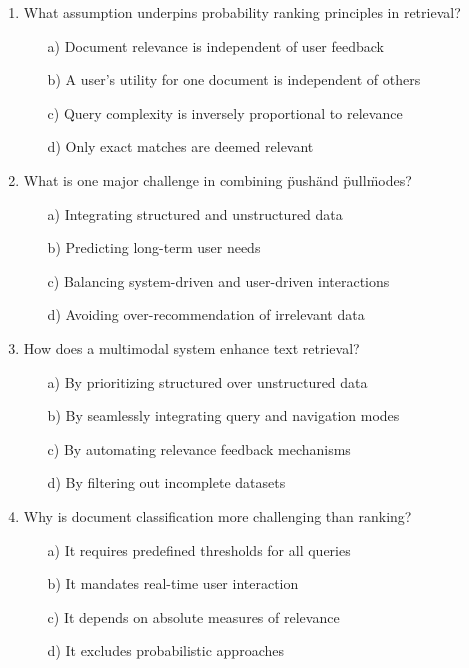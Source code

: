 \documentclass[8pt]{extarticle}
\begin{document}
\begin{multicols}{2}
\begin{enumerate}
\item What assumption underpins probability ranking principles in retrieval?
\begin{itemize}
    \item[a)] Document relevance is independent of user feedback
    \item[b)] A user's utility for one document is independent of others
    \item[c)] Query complexity is inversely proportional to relevance
    \item[d)] Only exact matches are deemed relevant
\end{itemize}

\item What is one major challenge in combining \"push\" and \"pull\" modes?
\begin{itemize}
    \item[a)] Integrating structured and unstructured data
    \item[b)] Predicting long-term user needs
    \item[c)] Balancing system-driven and user-driven interactions
    \item[d)] Avoiding over-recommendation of irrelevant data
\end{itemize}

\item How does a multimodal system enhance text retrieval?
\begin{itemize}
    \item[a)] By prioritizing structured over unstructured data
    \item[b)] By seamlessly integrating query and navigation modes
    \item[c)] By automating relevance feedback mechanisms
    \item[d)] By filtering out incomplete datasets
\end{itemize}

\item Why is document classification more challenging than ranking?
\begin{itemize}
    \item[a)] It requires predefined thresholds for all queries
    \item[b)] It mandates real-time user interaction
    \item[c)] It depends on absolute measures of relevance
    \item[d)] It excludes probabilistic approaches
\end{itemize}


\end{enumerate}
\end{multicols}
\end{document}
